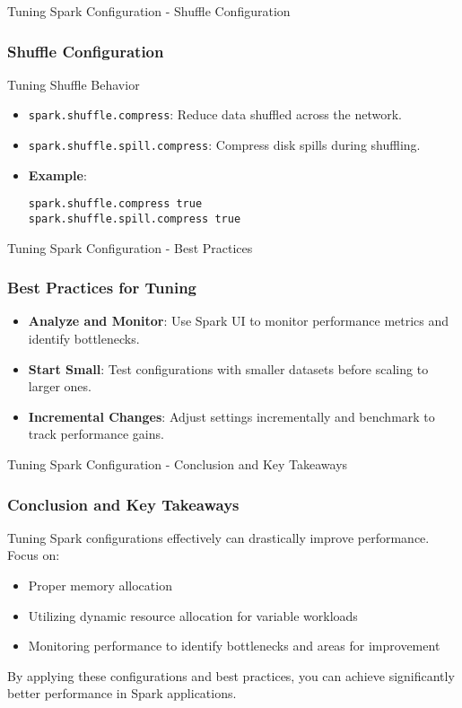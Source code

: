 \documentclass[aspectratio=169]{beamer}
\begin{document}
\begin{frame}[fragile]{Tuning Spark Configuration - Shuffle Configuration}
    \frametitle{Shuffle Configuration}
    
    \begin{block}{Tuning Shuffle Behavior}
        \begin{itemize}
            \item \texttt{spark.shuffle.compress}: Reduce data shuffled across the network.
            \item \texttt{spark.shuffle.spill.compress}: Compress disk spills during shuffling.
            \item \textbf{Example}:
            \begin{lstlisting}
spark.shuffle.compress true
spark.shuffle.spill.compress true
            \end{lstlisting}
        \end{itemize}
    \end{block}
\end{frame}

\begin{frame}[fragile]{Tuning Spark Configuration - Best Practices}
    \frametitle{Best Practices for Tuning}
    
    \begin{itemize}
        \item \textbf{Analyze and Monitor}: Use Spark UI to monitor performance metrics and identify bottlenecks.
        \item \textbf{Start Small}: Test configurations with smaller datasets before scaling to larger ones.
        \item \textbf{Incremental Changes}: Adjust settings incrementally and benchmark to track performance gains.
    \end{itemize}
\end{frame}

\begin{frame}[fragile]{Tuning Spark Configuration - Conclusion and Key Takeaways}
    \frametitle{Conclusion and Key Takeaways}
    
    Tuning Spark configurations effectively can drastically improve performance. Focus on:
    \begin{itemize}
        \item Proper memory allocation
        \item Utilizing dynamic resource allocation for variable workloads
        \item Monitoring performance to identify bottlenecks and areas for improvement
    \end{itemize}
    
    By applying these configurations and best practices, you can achieve significantly better performance in Spark applications.
\end{frame}
\end{document}
